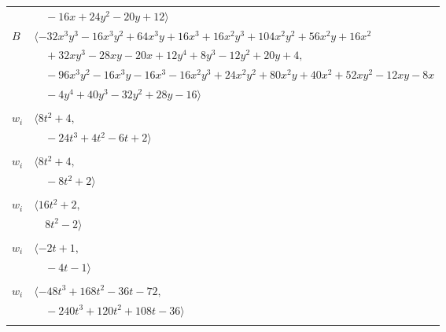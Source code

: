 \documentclass[11pt]{article}
\begin{document}
\begin{longtable}{@{}ll@{}}
 & $\quad -16x+24y^{2}-20y+12\rangle$\\
$B$ & $\langle -32x^{3}y^{3}-16x^{3}y^{2}+64x^{3}y+16x^{3}+16x^{2}y^{3}+104x^{2}y^{2}+56x^{2}y+16x^{2}$\\
 & $\quad +32xy^{3}-28xy-20x+12y^{4}+8y^{3}-12y^{2}+20y+4,$\\
 & $\quad -96x^{3}y^{2}-16x^{3}y-16x^{3}-16x^{2}y^{3}+24x^{2}y^{2}+80x^{2}y+40x^{2}+52xy^{2}-12xy-8x$\\
 & $\quad -4y^{4}+40y^{3}-32y^{2}+28y-16\rangle$\\
\addlinespace[2pt]
\multicolumn{2}{@{}p{0.97\textwidth}@{}}{$i=10$, $D_i=2$, $\rho_{ij}$: $0{:}2, \allowbreak 2{:}1, \allowbreak 6{:}1, \allowbreak 20{:}2, \allowbreak 22{:}1, \allowbreak 23{:}2$}\\
$w_i$ & $\langle 8t^{2}+4,$\\
 & $\quad -24t^{3}+4t^{2}-6t+2\rangle$\\
\addlinespace[2pt]
\multicolumn{2}{@{}p{0.97\textwidth}@{}}{$i=11$, $D_i=1$, $\rho_{ij}$: $0{:}1, \allowbreak 5{:}2, \allowbreak 6{:}2, \allowbreak 7{:}1, \allowbreak 8{:}1, \allowbreak 12{:}1$}\\
$w_i$ & $\langle 8t^{2}+4,$\\
 & $\quad -8t^{2}+2\rangle$\\
\addlinespace[2pt]
\multicolumn{2}{@{}p{0.97\textwidth}@{}}{$i=12$, $D_i=1$, $\rho_{ij}$: $2{:}2, \allowbreak 5{:}2, \allowbreak 7{:}1, \allowbreak 9{:}2, \allowbreak 11{:}2, \allowbreak 15{:}1$}\\
$w_i$ & $\langle 16t^{2}+2,$\\
 & $\quad 8t^{2}-2\rangle$\\
\addlinespace[2pt]
\multicolumn{2}{@{}p{0.97\textwidth}@{}}{$i=13$, $D_i=1$, $\rho_{ij}$: $3{:}1, \allowbreak 6{:}1, \allowbreak 14{:}1, \allowbreak 19{:}1, \allowbreak 24{:}1$}\\
$w_i$ & $\langle -2t+1,$\\
 & $\quad -4t-1\rangle$\\
\addlinespace[2pt]
\multicolumn{2}{@{}p{0.97\textwidth}@{}}{$i=14$, $D_i=2$, $\rho_{ij}$: $6{:}2, \allowbreak 8{:}1, \allowbreak 9{:}2, \allowbreak 13{:}2, \allowbreak 16{:}2, \allowbreak 17{:}1, \allowbreak 19{:}2, \allowbreak 22{:}2$}\\
$w_i$ & $\langle -48t^{3}+168t^{2}-36t-72,$\\
 & $\quad -240t^{3}+120t^{2}+108t-36\rangle$\\
\addlinespace[2pt]
\multicolumn{2}{@{}p{0.97\textwidth}@{}}{$i=15$, $D_i=1$, $\rho_{ij}$: $0{:}1, \allowbreak 1{:}1, \allowbreak 4{:}2, \allowbreak 9{:}1, \allowbreak 12{:}2, \allowbreak 16{:}1, \allowbreak 17{:}2, \allowbreak 18{:}1, \allowbreak 20{:}1$}\\

\end{longtable}
\end{document}
